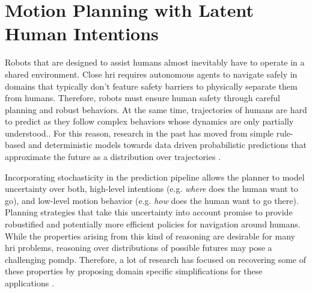 \chapter{Motion Planning with Latent Human Intentions}\label{chap:hri}

Robots that are designed to assist humans almost inevitably have to operate in
a shared environment. Close \ac{hri} requires autonomous agents to navigate
safely in domains that typically don't feature safety barriers to physically
separate them from humans. Therefore, robots must ensure human safety through
careful planning and robust behaviors. At the same time, trajectories of humans
are hard to predict as they follow complex behaviors whose dynamics are only
partially understood.. For this reason, research in the past
has moved from simple rule-based and deterministic models  towards data driven probabilistic predictions that approximate the future
as a distribution over trajectories .

Incorporating stochasticity in the prediction pipeline allows the planner to
model uncertainty over both, high-level intentions (e.g. \emph{where} does the
human want to go), and low-level motion behavior (e.g. \emph{how} does the
human want to go there). Planning strategies that take this uncertainty into
account promise to provide robustified and potentially more efficient policies
for navigation around humans. While the properties arising from this kind of
reasoning are desirable for many \ac{hri} problems, reasoning over
distributions of possible futures may pose a challenging \ac{pomdp}. Therefore,
a lot of research has focused on recovering some of these properties by
proposing domain specific simplifications for these applications
\cite{fern2007decision, sadigh2016information, javdani2018shared, fisac2018probabilistically}.

